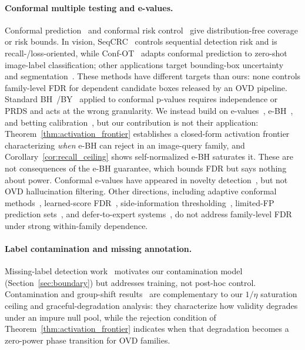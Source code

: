 \documentclass{article}
\theoremstyle{remark}
\newcommand{\1}{\mathbf{1}}
\begin{document}
\paragraph{Conformal multiple testing and e-values.}
Conformal prediction~\cite{angelopoulos2023conformal} and conformal
risk control~\cite{angelopoulos2022conformal} give distribution-free
coverage or risk bounds. In vision, SeqCRC~\cite{andeol:hal-05399935}
controls sequential detection risk and is recall-/loss-oriented, while
Conf-OT~\cite{silva2025conformal} adapts conformal prediction to
zero-shot image-label classification; other applications target
bounding-box uncertainty~\cite{timans2024adaptive} and
segmentation~\cite{mossina2025controlling}. These methods have
different targets than ours: none controls family-level FDR for
dependent candidate boxes released by an OVD pipeline.
Standard BH~\cite{benjamini1995controlling}/BY~\cite{benjamini2001control}
applied to conformal p-values requires
independence or PRDS and acts at the wrong granularity. We instead
build on e-values~\cite{vovk2021values}, e-BH~\cite{wang2022false},
and betting calibration~\cite{10.1093/jrsssb/qkad009}, but our
contribution is not their application:
Theorem~\ref{thm:activation_frontier} establishes a closed-form activation
frontier characterizing \emph{when} e-BH can reject in an image-query
family, and Corollary~\ref{cor:recall_ceiling} shows self-normalized
e-BH saturates it. These are not consequences of the e-BH guarantee,
which bounds FDR but says nothing about power.
Conformal e-values have appeared in novelty
detection~\cite{bashari2023derandomized}, but not OVD hallucination
filtering.
Other directions, including adaptive conformal
methods~\cite{gibbs2025conformal}, learned-score
FDR~\cite{marandon2022machine}, side-information
thresholding~\cite{lei2018adapt}, limited-FP prediction
sets~\cite{fisch2022conformal}, and defer-to-expert
systems~\cite{montreuil2024two}, do not address family-level FDR
under strong within-family dependence.

\paragraph{Label contamination and missing annotation.}
Missing-label detection work~\cite{xu2019missing,yang2020object}
motivates our contamination model (Section~\ref{sec:boundary}) but
addresses training, not post-hoc control. Contamination and group-shift
results~\cite{bates2023testing,barber2023conformal} are complementary
to our $1/\eta$ saturation ceiling and graceful-degradation analysis:
they characterize how validity degrades under an impure null pool,
while the rejection condition of Theorem~\ref{thm:activation_frontier}
indicates when that degradation becomes a zero-power phase transition
for OVD families.
\end{document}
